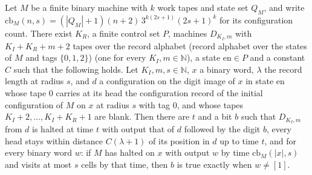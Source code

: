 \begin{lemma}
\label{Complexity.sph_suffix}
\leanok
{}
Let $M$ be a finite binary machine with $k$ work tapes and state set $Q_M$, and write
$\mathrm{cb}_M(n,s)=(|Q_M|+1)(n+2)\,3^{k(2s+1)}(2s+1)^{k}$ for its configuration count. There exist $K_R$, a finite control set $P$, machines
$D_{K_I,m}$ with $K_I+K_R+m+2$ tapes over the record alphabet (record alphabet over the states of $M$ and tags $\{0,1,2\}$) (one for every
$K_I,m\in\mathbb{N}$), a state $\mathrm{en}\in P$ and a constant $C$ such that the following holds.
Let $K_I,m,s\in\mathbb{N}$, $x$ a binary word, $\lambda$ the record length at radius $s$, and $d$ a
configuration on the digit image of $x$ in state $\mathrm{en}$ whose tape $0$ carries at its head
the configuration record of the initial configuration of $M$ on $x$ at radius $s$ with tag $0$,
and whose tapes $K_I+2,\dots,K_I+K_R+1$ are blank. Then there are $t$ and a bit $b$ such that
$D_{K_I,m}$ from $d$ is halted at time $t$ with output that of $d$ followed by the digit $b$, every
head stays within distance $C(\lambda+1)$ of its position in $d$ up to time $t$, and for every
binary word $w$: if $M$ has halted on $x$ with output $w$ by time $\mathrm{cb}_M(|x|,s)$ and visits
at most $s$ cells by that time, then $b$ is true exactly when $w\ne[1]$.
\end{lemma}

